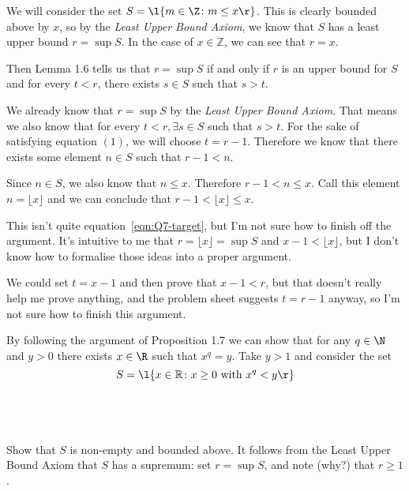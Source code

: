 \documentclass[a4paper]{article}
\begin{document}
We will consider the set $S = \l\{ m \in \Z \colon m \le x \r\}$. This is clearly bounded above by $x$, so by the \textit{Least Upper Bound Axiom}, we know that $S$ has a least upper bound $r = \sup S$. In the case of $x \in \mathbb Z$, we can see that $r = x$.

Then Lemma 1.6 tells us that $r = \sup S$ if and only if $r$ is an upper bound for $S$ and for every $t < r$, there exists $s \in S$ such that $s > t$.

We already know that $r = \sup S$ by the \textit{Least Upper Bound Axiom}. That means we also know that for every $t < r, \exists s \in S$ such that $s > t$. For the sake of satisfying equation $(1)$, we will choose $t = r - 1$. Therefore we know that there exists some element $n \in S$ such that $r - 1 < n$.

Since $n \in S$, we also know that $n \le x$. Therefore $r - 1 < n \le x$. Call this element $n = \lfloor x \rfloor$ and we can conclude that $r - 1 < \lfloor x \rfloor \le x$.

This isn't quite equation~\eqref{eqn:Q7-target}, but I'm not sure how to finish off the argument. It's intuitive to me that $r = \lfloor x \rfloor = \sup S$ and $x - 1 < \lfloor x \rfloor$, but I don't know how to formalise those ideas into a proper argument.

We could set $t = x - 1$ and then prove that $x - 1 < r$, but that doesn't really help me prove anything, and the problem sheet suggests $t = r - 1$ anyway, so I'm not sure how to finish this argument.

\renewcommand{\thesubsection}{Q\arabic{section}~(\roman{subsection})}

\begin{questionbody}
By following the argument of Proposition 1.7 we can show that for any $q \in \N$ and $y > 0$ there exists $x \in \R$ such that $x^q = y$. Take $y > 1$ and consider the set
\[ S = \l\{ x \in \mathbb R \colon x \ge 0 \text{ with } x^q < y \r\} \]
\end{questionbody}

\subsection{~} %

\begin{questionbody}
Show that $S$ is non-empty and bounded above. It follows from the Least Upper Bound Axiom that $S$ has a supremum: set $r = \sup S$, and note (why?) that $r \ge 1$.
\end{questionbody}
\end{document}
